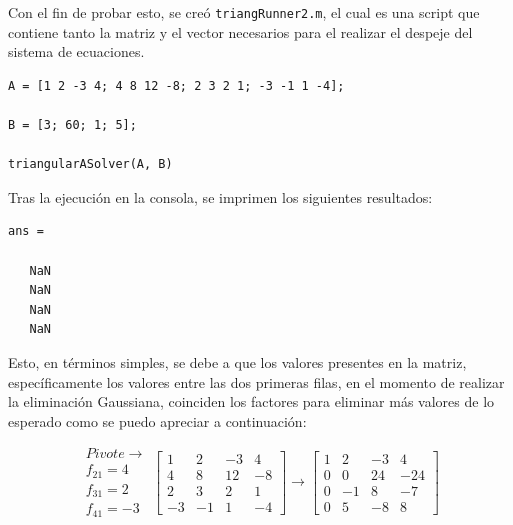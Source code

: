 \documentclass[english,notitlepage,letterpaper, 10pt]{article} %
\begin{document}
\begin{enumerate}
\begin{enumerate}
          Con el fin de probar esto, se creó \texttt{triangRunner2.m}, el cual es una script que contiene tanto la matriz y el vector necesarios para el realizar el despeje del sistema de ecuaciones. 

          \begin{lstlisting}
A = [1 2 -3 4; 4 8 12 -8; 2 3 2 1; -3 -1 1 -4];

B = [3; 60; 1; 5];

triangularASolver(A, B)
          \end{lstlisting}

          Tras la ejecución en la consola, se imprimen los siguientes resultados:

          \begin{lstlisting}
ans =

   NaN
   NaN
   NaN
   NaN
          \end{lstlisting}
            
          Esto, en términos simples, se debe a que los valores presentes en la matriz, específicamente los valores entre las dos primeras filas, en el momento de realizar la eliminación Gaussiana, coinciden los factores para eliminar más valores de lo esperado como se puedo apreciar a continuación:
          
          \begin{displaymath}
            \begin{matrix}
              Pivote \rightarrow \\
              f_{21} = 4 \\
              f_{31} = 2 \\
              f_{41} = -3
            \end{matrix}
            \begin{bmatrix}
              1 & 2 & -3 & 4 \\
              4 & 8 & 12 & -8 \\
              2 & 3 & 2 & 1 \\
              -3 & -1 & 1 & -4
            \end{bmatrix}
            \longrightarrow
            \begin{bmatrix}
              1 & 2 & -3 & 4 \\
              0 & 0 & 24 & -24 \\
              0 & -1 & 8 & -7 \\
              0 & 5 & -8 & 8
            \end{bmatrix}
          \end{displaymath}
          

\end{enumerate}
\end{enumerate}
\end{document}
